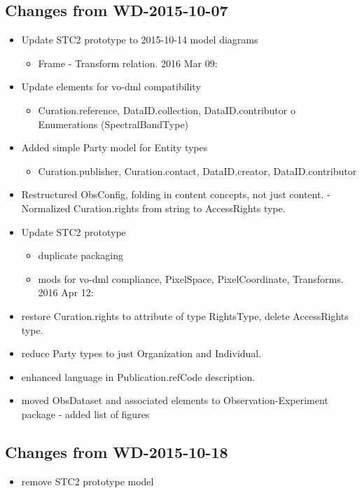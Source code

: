 \subsection{Changes from WD-2015-10-07}
\begin{itemize} %
  \item Update STC2 prototype to 2015-10-14 model diagrams
  \begin{itemize}
    \item Frame - Transform relation. 2016 Mar 09:
  \end{itemize}
  \item Update elements for vo-dml compatibility
  \begin{itemize}
    \item Curation.reference, DataID.collection, DataID.contributor o Enumerations (SpectralBandType)
  \end{itemize}
  \item Added simple Party model for Entity types
  \begin{itemize}
    \item Curation.publisher, Curation.contact, DataID.creator, DataID.contributor
  \end{itemize}
  \item Restructured ObsConfig, folding in content concepts, not just content. - Normalized Curation.rights from string to AccessRights type.
  \item Update STC2 prototype
  \begin{itemize}
    \item duplicate packaging
    \item mods for vo-dml compliance, PixelSpace, PixelCoordinate, Transforms. 2016 Apr 12:
  \end{itemize}
  \item restore Curation.rights to attribute of type RightsType, delete AccessRights type.
  \item reduce Party types to just Organization and Individual.
  \item enhanced language in Publication.refCode description.
  \item moved ObsDataset and associated elements to Observation-Experiment package - added list of figures
\end{itemize}

\subsection{Changes from WD-2015-10-18}
\begin{itemize} %
  \item remove STC2 prototype model
\end{itemize}

